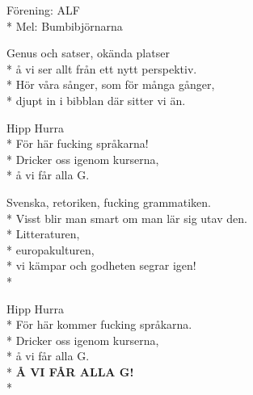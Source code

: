 \begin{SongText}[Språkarsången]
    \begin{SongInfo}
        Förening: ALF\\*%
        Mel: Bumbibjörnarna
    \end{SongInfo}
    \begin{SongVerse}
        Genus och satser, okända platser\\*%
        å vi ser allt från ett nytt perspektiv.\\*%
        Hör våra sånger, som för många gånger,\\*%
        djupt in i bibblan där sitter vi än.
    \end{SongVerse}
    \begin{SongVerse}
        Hipp Hurra\\*%
        För här fucking språkarna!\\*%
        Dricker oss igenom kurserna,\\*%
        å vi får alla G.
    \end{SongVerse}
    \begin{SongVerse}
        Svenska, retoriken, fucking grammatiken.\\*%
        Visst blir man smart om man lär sig utav den.\\*%
        Litteraturen,\\*%
        europakulturen,\\*%
        vi kämpar och godheten segrar igen!\\*%
    \end{SongVerse}
    \begin{SongVerse}
        Hipp Hurra\\*%
        För här kommer fucking språkarna.\\*%
        Dricker oss igenom kurserna,\\*%
        å vi får alla G.\\*%
        \textbf{Å VI FÅR ALLA G!}\\*%
    \end{SongVerse}
\end{SongText}
